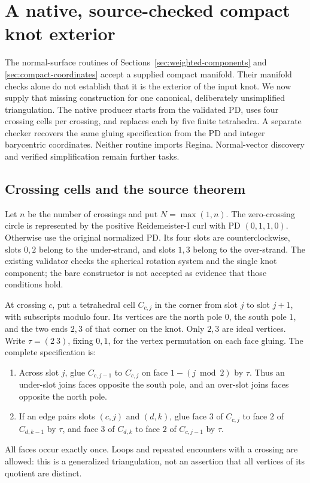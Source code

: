 \section{A native, source-checked compact knot exterior}
\label{sec:diagram-exterior}

The normal-surface routines of Sections~\ref{sec:weighted-components} and
\ref{sec:compact-coordinates} accept a supplied compact manifold. Their
manifold checks alone do not establish that it is the exterior of the input
knot. We now supply that missing construction for one canonical, deliberately
unsimplified triangulation. The native producer starts from the validated PD,
uses four crossing cells per crossing, and replaces each by five finite
tetrahedra. A separate checker recovers the same gluing specification from
the PD and integer barycentric coordinates. Neither routine imports Regina.
Normal-vector discovery and verified simplification remain further tasks.

\subsection{Crossing cells and the source theorem}

Let $n$ be the number of crossings and put $N=\max(1,n)$. The zero-crossing
circle is represented by the positive Reidemeister-I curl with PD
$(0,1,1,0)$. Otherwise use the original normalized PD. Its four slots are
counterclockwise, slots $0,2$ belong to the under-strand, and slots $1,3$
belong to the over-strand. The existing validator checks the spherical
rotation system and the single knot component; the bare 
constructor is not accepted as evidence that those conditions hold.

At crossing $c$, put a tetrahedral cell $C_{c,j}$ in the corner from slot $j$
to slot $j+1$, with subscripts modulo four. Its vertices are the north pole
$0$, the south pole $1$, and the two ends $2,3$ of that corner on the knot.
Only $2,3$ are ideal vertices. Write $\tau=(2\ 3)$, fixing $0,1$, for the
vertex permutation on each face gluing. The complete specification is:
\begin{enumerate}
\item Across slot $j$, glue $C_{c,j-1}$ to $C_{c,j}$ on face
  $1-(j\bmod2)$ by $\tau$. Thus an under-slot joins faces opposite the
  south pole, and an over-slot joins faces opposite the north pole.
\item If an edge pairs slots $(c,j)$ and $(d,k)$, glue face $3$ of
  $C_{c,j}$ to face $2$ of $C_{d,k-1}$ by $\tau$, and face $3$ of
  $C_{d,k}$ to face $2$ of $C_{c,j-1}$ by $\tau$.
\end{enumerate}
All faces occur exactly once. Loops and repeated encounters with a crossing
are allowed: this is a generalized triangulation, not an assertion that all
vertices of its quotient are distinct.

